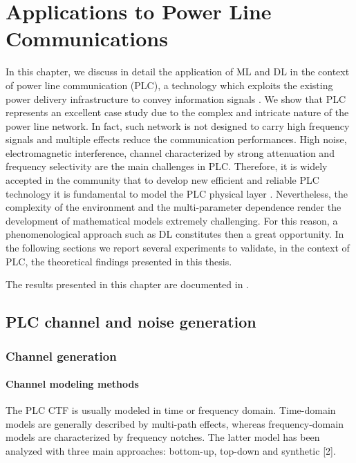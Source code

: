 \chapter{Applications to Power Line Communications} %
\label{sec:plc}

In this chapter, we discuss in detail the application of
ML and DL in the context of power line communication (PLC), a technology which exploits the existing power delivery infrastructure to convey information signals \cite{LampeTonelloSwart}.
We show that PLC represents an excellent case study due to the complex and intricate nature of the power line network. 
In fact, such network is not designed to carry
high frequency signals and multiple effects reduce the communication performances. High noise, electromagnetic interference, channel characterized by strong attenuation and frequency selectivity are the main challenges in PLC. Therefore, it is widely accepted in the community that to develop new efficient and reliable PLC technology it is fundamental to model the PLC physical layer \cite{LampeTonelloSwart}. 
Nevertheless, the complexity of the environment and the multi-parameter dependence render the development of mathematical models extremely challenging. For this reason, a phenomenological approach such as DL constitutes then a great opportunity. 
In the following sections we report several experiments to validate, in the context of PLC, the theoretical findings presented in this thesis. 

The results presented in this chapter are documented in \cite{ML_PLC, RighiniLetizia2019, Letizia2019a, TonelloImpedance, LetiziaIsplc2021, Letizia2019c}.

\section{PLC channel and noise generation}
\label{sec:plc_gan}

\subsection{Channel generation}
\label{subsec:plc_channel}

\subsubsection{Channel modeling methods}
The PLC CTF is usually modeled in time or frequency domain.
Time-domain models are generally described by multi-path effects, whereas frequency-domain models are characterized
by frequency notches. The latter model has been analyzed with three main approaches: bottom-up,
top-down and synthetic [2].

